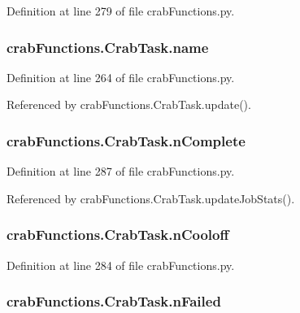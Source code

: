 Definition at line 279 of file crab\-Functions.\-py.

\subsubsection[{name}]{\setlength{\rightskip}{0pt plus 5cm}crab\-Functions.\-Crab\-Task.\-name}\label{classcrabFunctions_1_1CrabTask_aa80858da99b1fcffc8c57b90c8c8764d}


Definition at line 264 of file crab\-Functions.\-py.



Referenced by crab\-Functions.\-Crab\-Task.\-update().

\subsubsection[{n\-Complete}]{\setlength{\rightskip}{0pt plus 5cm}crab\-Functions.\-Crab\-Task.\-n\-Complete}\label{classcrabFunctions_1_1CrabTask_a4bc6a096cbaf7d7856f849fbbafce01c}


Definition at line 287 of file crab\-Functions.\-py.



Referenced by crab\-Functions.\-Crab\-Task.\-update\-Job\-Stats().

\subsubsection[{n\-Cooloff}]{\setlength{\rightskip}{0pt plus 5cm}crab\-Functions.\-Crab\-Task.\-n\-Cooloff}\label{classcrabFunctions_1_1CrabTask_a91df6d635863bd407e0d368bc02c673f}


Definition at line 284 of file crab\-Functions.\-py.

\subsubsection[{n\-Failed}]{\setlength{\rightskip}{0pt plus 5cm}crab\-Functions.\-Crab\-Task.\-n\-Failed}\label{classcrabFunctions_1_1CrabTask_ac3f25df360da05d896e74a8581b68f1e}


